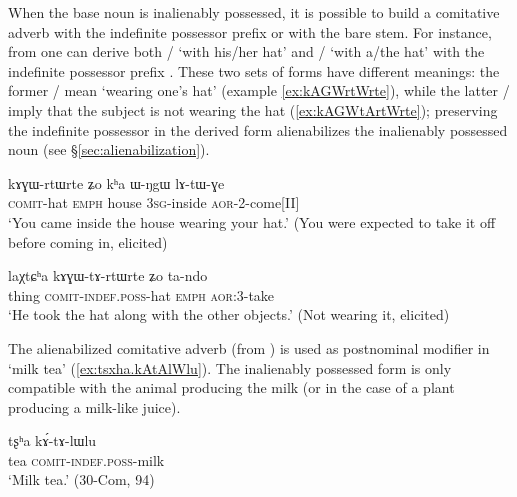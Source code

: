 When the base noun is  inalienably possessed, it is possible to build a comitative adverb with the indefinite possessor prefix or with the bare stem. For instance, from  one can derive both  /  `with his/her hat' and  /   `with a/the hat' with the indefinite possessor prefix . These two sets of forms have different meanings: the former  /  mean `wearing one's hat' (example \ref{ex:kAGWrtWrte}), while the latter  /   imply that the subject is not wearing the hat (\ref{ex:kAGWtArtWrte}); preserving the indefinite possessor in the derived form alienabilizes the inalienably possessed noun (see §\ref{sec:alienabilization}).

\begin{exe}
\ex \label{ex:kAGWrtWrte}
\gll kɤɣɯ-rtɯ\tld{}rte 	ʑo 	kʰa	ɯ-ŋgɯ	lɤ-tɯ-ɣe	\\
\textsc{comit}-hat \textsc{emph} house \textsc{3sg}-inside \textsc{aor}-2-come[II] \\
\glt `You came inside the house wearing your hat.' (You were expected to take it off before coming in, elicited)
\end{exe}

\begin{exe}
\ex \label{ex:kAGWtArtWrte}
\gll  laχtɕʰa kɤɣɯ-tɤ-rtɯ\redp{}rte ʑo ta-ndo \\
thing \textsc{comit}-\textsc{indef}.\textsc{poss}-hat \textsc{emph} \textsc{aor}:3\flobv{}-take \\
\glt `He took the hat along with the other objects.' (Not wearing it, elicited)
\end{exe}

The alienabilized comitative adverb  (from ) is used as postnominal modifier in `milk tea' (\ref{ex:tsxha.kAtAlWlu}). The inalienably possessed form  is only compatible with the animal producing the milk (or in the case of a plant producing a milk-like juice).

\begin{exe}
\ex \label{ex:tsxha.kAtAlWlu}
\gll   tʂʰa kɤ́-tɤ-lɯ\redp{}lu \\
 tea \textsc{comit}-\textsc{indef}.\textsc{poss}-milk \\
\glt  `Milk tea.'  (30-Com, 94)
\end{exe}

